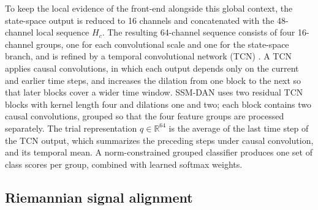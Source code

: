\documentclass[preprint,12pt]{elsarticle}
\begin{document}
To keep the local evidence of the front-end alongside this global context, the state-space output is reduced to 16 channels and concatenated with the 48-channel local sequence $H_c$. The resulting 64-channel sequence consists of four 16-channel groups, one for each convolutional scale and one for the state-space branch, and is refined by a temporal convolutional network (TCN) \cite{altaheri2023atcnet}. A TCN applies causal convolutions, in which each output depends only on the current and earlier time steps, and increases the dilation from one block to the next so that later blocks cover a wider time window. SSM-DAN uses two residual TCN blocks with kernel length four and dilations one and two; each block contains two causal convolutions, grouped so that the four feature groups are processed separately. The trial representation $q\in\mathbb{R}^{64}$ is the average of the last time step of the TCN output, which summarizes the preceding steps under causal convolution, and its temporal mean. A norm-constrained grouped classifier produces one set of class scores per group, combined with learned softmax weights.

\subsection{Riemannian signal alignment}
\label{subsec:ra}
\end{document}
